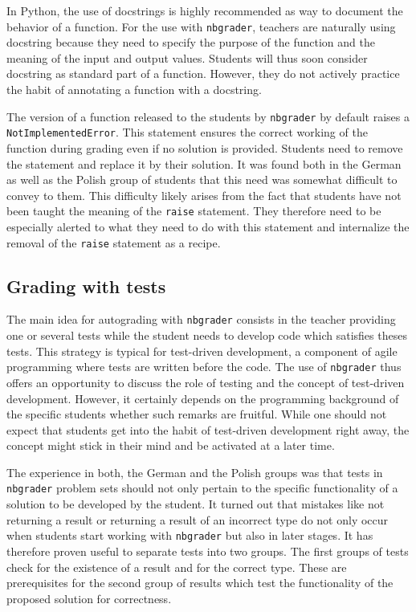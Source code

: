\documentclass[twocolumn]{svjour3}          %
\begin{document}
In Python, the use of docstrings is highly recommended as way to document
the behavior of a function. For the use with \texttt{nbgrader}, teachers are
naturally using docstring because they need to specify the purpose of the
function and the meaning of the input and output values. Students will thus
soon consider docstring as standard part of a function. However, they do not
actively practice the habit of annotating a function with a docstring.

The version of a function released to the students by \texttt{nbgrader} by
default raises a \texttt{NotImplementedError}. This statement ensures the
correct working of the function during grading even if no solution is provided.
Students need to remove the statement and replace it by their solution. It was
found both in the German as well as the Polish group of students that this need
was somewhat difficult to convey to them. This difficulty likely arises from
the fact that students have not been taught the meaning of the \texttt{raise}
statement. They therefore need to be especially alerted to what they need to do
with this statement and internalize the removal of the \texttt{raise} statement
as a recipe.

\subsection{Grading with tests}

The main idea for autograding with \texttt{nbgrader} consists in the teacher
providing one or several tests while the student needs to develop code which
satisfies theses tests. This strategy is typical for test-driven development,
a component of agile programming where tests are written before the code.
The use of \texttt{nbgrader} thus offers an opportunity to discuss the role
of testing and the concept of test-driven development. However, it certainly
depends on the programming background of the specific students whether such
remarks are fruitful. While one should not expect that students get into the
habit of test-driven development right away, the concept might stick in their
mind and be activated at a later time.

The experience in both, the German and the Polish groups was that tests in
\texttt{nbgrader} problem sets should not only pertain to the specific
functionality of a solution to be developed by the student. It turned out
that mistakes like not returning a result or returning a result of an incorrect
type do not only occur when students start working with \texttt{nbgrader} but
also in later stages. It has therefore proven useful to separate tests into
two groups. The first groups of tests check for the existence of a result
and for the correct type. These are prerequisites for the second group of results
which test the functionality of the proposed solution for correctness.
\end{document}
